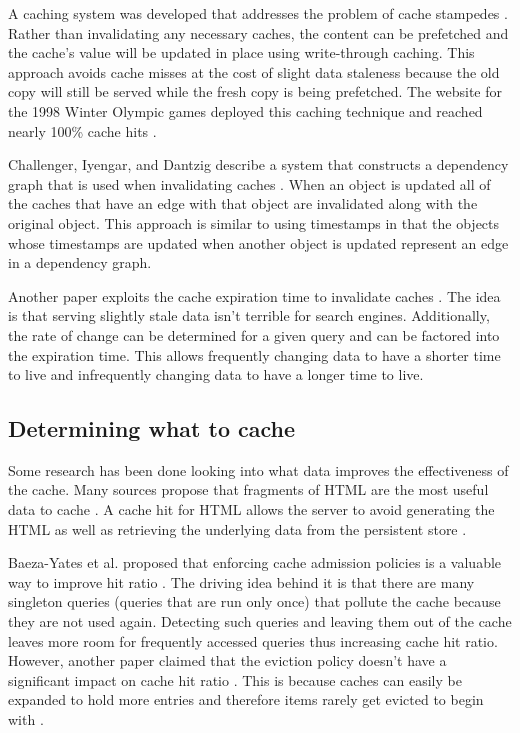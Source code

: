 \documentclass[12pt]{ucthesis}
\begin{document}
A caching system was developed that addresses the problem of cache stampedes \cite{scalableConsistentCaching}.
Rather than invalidating any necessary caches, the content can be prefetched and the cache's value will be updated in place using write-through caching.
This approach avoids cache misses at the cost of slight data staleness because the old copy will still be served while the fresh copy is being prefetched.
The website for the 1998 Winter Olympic games deployed this caching technique and reached nearly 100\% cache hits \cite{scalableConsistentCaching}.

Challenger, Iyengar, and Dantzig describe a system that constructs a dependency graph that is used when invalidating caches \cite{scalableConsistentCaching}.
When an object is updated all of the caches that have an edge with that object are invalidated along with the original object.
This approach is similar to using timestamps in that the objects whose timestamps are updated when another object is updated represent an edge in a dependency graph.

Another paper exploits the cache expiration time to invalidate caches \cite{refreshingPerspectiveSearch}.
The idea is that serving slightly stale data isn't terrible for search engines.
Additionally, the rate of change can be determined for a given query and can be factored into the expiration time.
This allows frequently changing data to have a shorter time to live and infrequently changing data to have a longer time to live.

\subsection{Determining what to cache}
Some research has been done looking into what data improves the effectiveness of the cache.
Many sources propose that fragments of HTML are the most useful data to cache \cite{comparisonOfCachingSolutions}\cite{scalableConsistentCaching}.
A cache hit for HTML allows the server to avoid generating the HTML as well as retrieving the underlying data from the persistent store \cite{howBasecampGotSoFast}.

Baeza-Yates et al. proposed that enforcing cache admission policies is a valuable way to improve hit ratio \cite{cacheAdmissionPolicies}.
The driving idea behind it is that there are many singleton queries (queries that are run only once) that pollute the cache because they are not used again.
Detecting such queries and leaving them out of the cache leaves more room for frequently accessed queries thus increasing cache hit ratio.
However, another paper claimed that the eviction policy doesn't have a significant impact on cache hit ratio \cite{refreshingPerspectiveSearch}.
This is because caches can easily be expanded to hold more entries and therefore items rarely get evicted to begin with \cite{refreshingPerspectiveSearch}.
\end{document}
